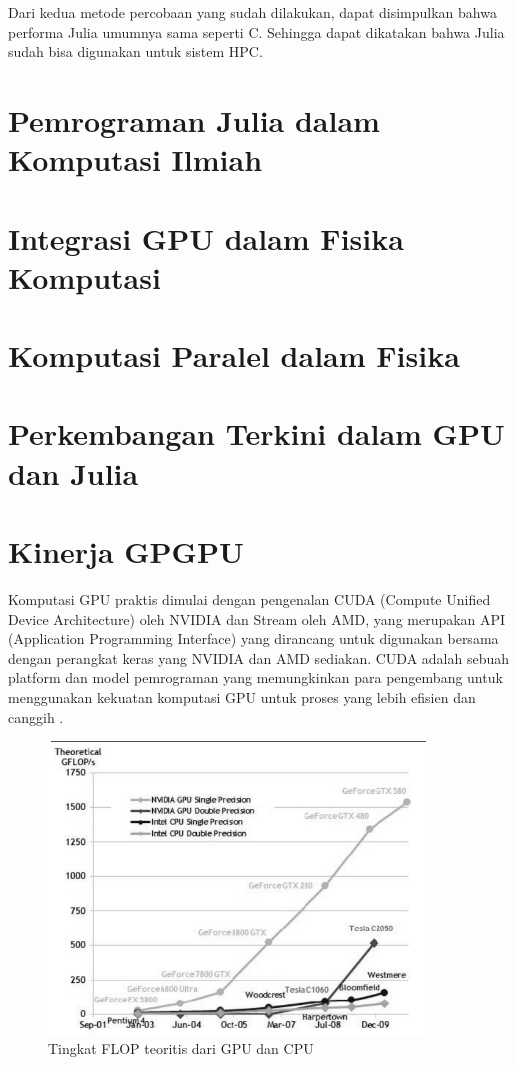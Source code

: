 Dari kedua metode percobaan yang sudah dilakukan, dapat disimpulkan bahwa
performa Julia umumnya sama seperti C. Sehingga dapat dikatakan bahwa Julia sudah
bisa digunakan untuk sistem HPC.

\section{Pemrograman Julia dalam Komputasi Ilmiah}

\section{Integrasi GPU dalam Fisika Komputasi}

\section{Komputasi Paralel dalam Fisika}

\section{Perkembangan Terkini dalam GPU dan Julia}

\section{Kinerja GPGPU}

Komputasi GPU praktis dimulai dengan pengenalan CUDA (Compute Unified Device Architecture)
oleh NVIDIA dan Stream oleh AMD, yang merupakan API (Application Programming
Interface) yang dirancang untuk digunakan bersama dengan perangkat keras yang NVIDIA
dan AMD sediakan. CUDA adalah sebuah platform dan model pemrograman yang
memungkinkan para pengembang untuk menggunakan kekuatan komputasi GPU untuk
proses yang lebih efisien dan canggih \citep{oanceaGPGPUComputing2014}.

\begin{figure}[h]
  \centering
  \includegraphics[width=10cm]{images/gpu-vs-cpu-flop-rates.png}
  \caption{Tingkat FLOP teoritis dari GPU dan CPU}
  \label{gambar flop rates gpu dan cpu}
\end{figure}

